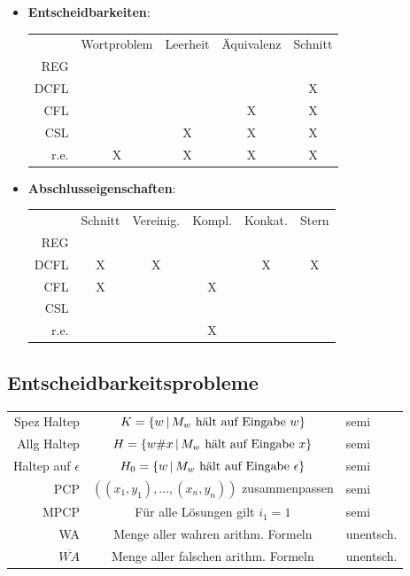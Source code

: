 \documentclass[landscape, 8pt, a4paper]{extarticle}
\newcommand{\set}[2]{\ensuremath\left\{ #1 \,\middle|\, #2 \right\}}
\begin{document}
\begin{multicols}{3}
\begin{itemize}
		\item \textbf{Entscheidbarkeiten}:

		\begin{tabular}{r|cccc}
			&Wortproblem&Leerheit&Äquivalenz&Schnitt\\
			REG&\checkmark&\checkmark&\checkmark&\checkmark\\
			DCFL&\checkmark&\checkmark&\checkmark&X\\
			CFL&\checkmark&\checkmark&X&X\\
			CSL&\checkmark&X&X&X\\
			r.e.&X&X&X&X
		\end{tabular}

		\item \textbf{Abschlusseigenschaften}:

		\begin{tabular}{r|ccccc}
			&Schnitt&Vereinig.&Kompl.&Konkat.&Stern\\
			REG&\checkmark&\checkmark&\checkmark&\checkmark&\checkmark\\
			DCFL&X&X&\checkmark&X&X\\
			CFL&X&\checkmark&X&\checkmark&\checkmark\\
			CSL&\checkmark&\checkmark&\checkmark&\checkmark&\checkmark\\
			r.e.&\checkmark&\checkmark&X&\checkmark&\checkmark
		\end{tabular}
	\end{itemize}


	\subsection{Entscheidbarkeitsprobleme}
	\begin{tabular}{r|c|l}
		Spez Haltep & $K=\set{w}{M_w \text{ hält auf Eingabe } w}$ & semi\\
		Allg Haltep & $H=\set{w\# x}{M_w \text{ hält auf Eingabe } x}$ & semi\\
		Haltep auf $\epsilon$ & $H_0=\set{w}{M_w \text{ hält auf Eingabe } \epsilon}$ & semi\\
		PCP & $((x_1,y_1),\ldots,(x_n,y_n))$ zusammenpassen & semi\\
		MPCP & Für alle Lösungen gilt $i_1=1$ & semi\\
		WA & Menge aller wahren arithm. Formeln & unentsch.\\
		$\overline{WA}$ & Menge aller falschen arithm. Formeln & unentsch.
	\end{tabular}


\end{multicols}
\end{document}
